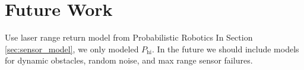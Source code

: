 \section{Future Work}

Use laser range return model from Probabilistic Robotics
In Section \ref{sec:sensor_model}, we only modeled $P_\text{hi}$.
In the future we should include models for dynamic obstacles, random noise, and max range sensor failures.
